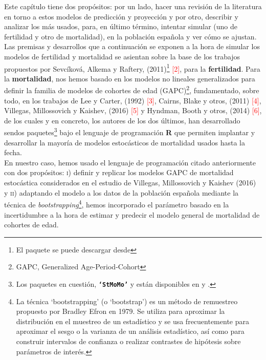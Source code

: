 Este cap\'itulo tiene dos propósitos: por un lado, hacer una revisión de la literatura en torno a estos modelos de predicción y proyección y por otro, describir y analizar los m\'as usados, para, en último término, intentar simular (uno de fertilidad y otro de mortalidad), en la población española y ver cómo se ajustan.\\

Las premisas y desarrollos que a continuaci\'on se exponen a la hora de simular los modelos de fertilidad y mortalidad se asientan sobre la base de los trabajos propuestos por Sevcíková, Alkema y Raftery, (2011)\footnote{El paquete \texttt{} se puede descargar desde \texttt{}} \textcolor{red}{[2]}, para la \textbf{fertilidad}. Para la \textbf{mortalidad}, nos hemos basado en los modelos no lineales generalizados para definir la familia de modelos de cohortes de edad (GAPC)\footnote{GAPC, Generalized Age-Period-Cohort}, fundamentado, sobre todo, en los trabajos de Lee y Carter, (1992) \textcolor{red}{[3]}, Cairns, Blake y otros, (2011) \textcolor{red}{[4]}, Villegas, Millossovich y Kaishev, (2016) \textcolor{red}{[5]} y Hyndman, Booth y otros, (2014) \textcolor{red}{[6]}, de los cuales y en concreto, los autores de los dos \'ultimos, han desarrollado sendos paquetes\footnote{Los paquetes en cuesti\'on, \texttt{\textbf{`StMoMo'}} y \texttt{} est\'an disponibles en \texttt{} y  \texttt{}.} bajo el lenguaje de programaci\'on \textbf{\textsf{R}} que permiten implantar y desarrollar la mayor\'ia de modelos estoc\'asticos de mortalidad usados hasta la fecha.\\

En nuestro caso, hemos usado el lenguaje de programaci\'on citado anteriormente con dos prop\'ositos: \textsc{i)} definir y replicar los modelos GAPC de mortalidad estoc\'astica considerados en el estudio de Villegas, Millossovich y Kaishev (2016) y \textsc{ii)} adaptando el modelo a los datos de la poblaci\'on espa\~nola mediante la t\'ecnica de \textit{bootstrapping}\footnote{La t\'ecnica `bootstrapping' (o `bootstrap') es un m\'etodo de remuestreo propuesto por Bradley Efron en 1979. Se utiliza para aproximar la distribuci\'on en el muestreo de un estad\'istico y se usa frecuentemente para aproximar el sesgo o la varianza de un an\'alisis estad\'istico, as\'i como para construir intervalos de confianza o realizar contrastes de hip\'otesis sobre par\'ametros de inter\'es.}, hemos incorporado el par\'ametro basado en la incertidumbre a la hora de estimar y predecir el modelo general de mortalidad de cohortes de edad.

